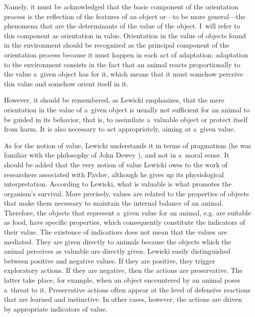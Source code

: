\documentclass[%
manuscript=article,
year=2024,
volume=77,
doi=00000.000,
]{zfn}
\begin{document}
Namely, it must be acknowledged that the basic component of the orientation process is the reflection of the features of an object or---to be more general---the phenomena that are the determinants of the value of the object. I~will refer to this component as orientation in value. Orientation in the value of objects found in the environment should be recognized as the principal component of the orientation process because it must happen in each act of adaptation: adaptation to the environment consists in the fact that an animal reacts proportionally to the value a~given object has for it, which means that it must somehow perceive this value and somehow orient itself in it. 
\parencite[][p.48]{lewicki_cognition_2016}%




However, it should be remembered, as Lewicki emphasizes, that the mere orientation in the value of a~given object is usually not sufficient for an animal to be guided in its behavior, that is, to assimilate a~valuable object or protect itself from harm. It is also necessary to act appropriately, aiming at a~given value.



As for the notion of value, Lewicki understands it in terms of pragmatism (he was familiar with the philosophy of John Dewey 
\parencite[cf.][p.234]{lewicki_procesy_1960}%
), and not in a~moral sense. It should be added that the very notion of value Lewicki owes to the work of researchers associated with Pavlov, although he gives up its physiological interpretation. According to Lewicki, what is valuable is what promotes the organism's survival. More precisely, values are related to the properties of objects that make them necessary to maintain the internal balance of an animal. Therefore, the objects that represent a~given value for an animal, e.g. are suitable as food, have specific properties, which consequently constitute the indicators of their value. The existence of indicatiors does not mean that the values are mediated. They are given directly to animals because the objects which the animal perceives as valuable are directly given. Lewicki easily distinguished between positive and negative values. If they are positive, they trigger exploratory actions. If they are negative, then the actions are preservative. The latter take place, for example, when an object encountered by an animal poses a~threat to it. Preservative actions often appear at the level of defensive reactions that are learned and instinctive. In other cases, however, the actions are driven by appropriate indicators of value.
\end{document}
